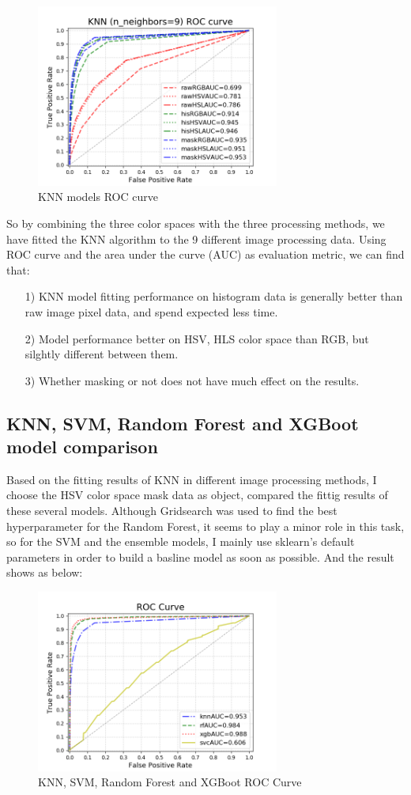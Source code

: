 \documentclass[11pt]{article}
\begin{document}
\begin{center}
\begin{figure}[htb]
\centering 
\includegraphics[width=8cm]{KNN-ROC.png}
\caption{KNN models ROC curve}
\end{figure}
\end{center} 
So by combining the three color spaces with the three processing methods, we have fitted the KNN algorithm to the 9 different image processing data. Using ROC curve and the area under the curve (AUC) as evaluation metric, we can find that:
\begin{itemize}
\item[1)] KNN model fitting performance on histogram data is generally better than raw image pixel data, and spend expected less time.
\item[2)] Model performance better on HSV, HLS color space than RGB, but silghtly different between them.
\item[3)] Whether masking or not does not have much effect on the results.
\end{itemize}

    
\subsection{KNN, SVM, Random Forest and XGBoot model comparison}
Based on the fitting results of KNN in different image processing methods, I choose the HSV color space mask data as object, compared the fittig results of these several models. Although Gridsearch was used to find the best hyperparameter for the Random Forest, it seems to play a minor role in this task, so for the SVM and the ensemble models, I mainly use sklearn's default parameters in order to build a basline model as soon as possible. And the result shows as below:
\begin{center}
\begin{figure}[htb]
\centering 
\includegraphics[width=8cm]{All-ROC.png}
\caption{KNN, SVM, Random Forest and XGBoot ROC Curve}
\end{figure}
\end{center}
\end{document}
